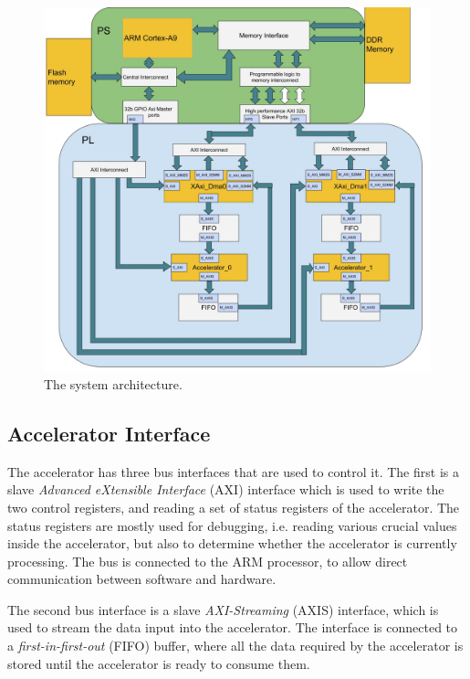 \begin{figure}[h!]
  \centering
      \includegraphics[width=1.0\textwidth]{Figures/Method/system_architecture}
    \caption{The system architecture.}
    \label{fig_system_architecture}
\end{figure}


\subsection{Accelerator Interface}

The accelerator has three bus interfaces that are used to control it. The first is a slave \textit{Advanced eXtensible Interface} (AXI) interface which is used to write the two control registers, and reading a set of status registers of the accelerator. The status registers are mostly used for debugging, i.e. reading various crucial values inside the accelerator, but also to determine whether the accelerator is currently processing. The bus is connected to the ARM processor, to allow direct communication between software and hardware.

The second bus interface is a slave \textit{AXI-Streaming} (AXIS) interface, which is used to stream the data input into the accelerator. The interface is connected to a \textit{first-in-first-out} (FIFO) buffer, where all the data required by the accelerator is stored until the accelerator is ready to consume them. 

